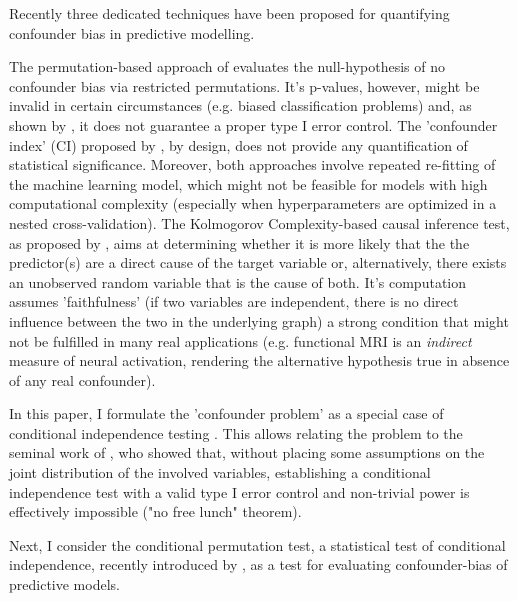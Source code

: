 \documentclass{article}
\begin{document}
Recently three dedicated techniques \citep{chaibub2019permutation, ferrari2020measuring, wachinger2021detect} have been proposed for quantifying confounder bias in predictive modelling.

The permutation-based approach of \cite{chaibub2019permutation} evaluates the null-hypothesis of no confounder bias via restricted permutations. It's p-values, however, might be invalid in certain circumstances (e.g. biased classification problems) and, as shown by \cite{ferrari2020measuring}, it does not guarantee a proper type I error control.
The 'confounder index' (CI) proposed by \cite{ferrari2020measuring}, by design, does not provide any quantification of statistical significance.
Moreover, both approaches involve repeated re-fitting of the machine learning model, which might not be feasible for models with high computational complexity (especially when hyperparameters are optimized in a nested cross-validation).
The Kolmogorov Complexity-based causal inference test, as proposed by \cite{wachinger2021detect}, aims at determining whether it is more likely that the the predictor(s) are a direct cause of the target variable or, alternatively, there exists an unobserved random variable that is the cause of both. It's computation assumes 'faithfulness' (if two variables are independent, there is no direct influence between the two in the underlying graph) a strong condition that might not be fulfilled in many real applications (e.g. functional MRI is an \emph{indirect} measure of neural activation, rendering the alternative hypothesis true in absence of any real confounder).


In this paper, I formulate the 'confounder problem' as a special case of conditional independence testing \citep{dawid1979conditional}. This allows relating the problem to the seminal work of \cite{shah2020hardness}, who showed that, without placing some assumptions on the joint distribution of the involved variables, establishing a conditional independence test with a valid type I error control and non-trivial power is effectively impossible ("no free lunch" theorem).

Next, I consider the conditional permutation test, a statistical test of conditional independence, recently introduced by \cite{berrett2020conditional}, as a test for evaluating confounder-bias of predictive models.
\end{document}
